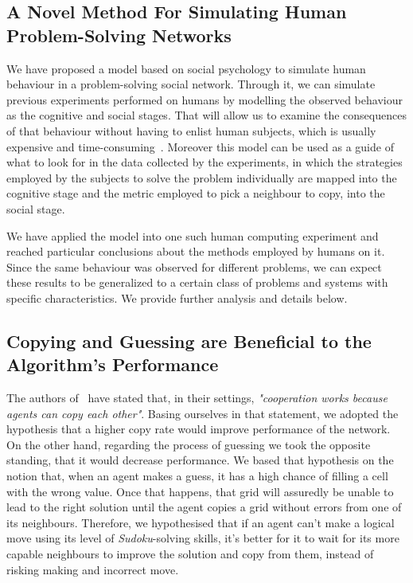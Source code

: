 \documentclass{article}
\begin{document}
\subsection{A Novel Method For Simulating Human Problem-Solving Networks}

We have proposed a model based on social psychology to simulate human behaviour in a problem-solving social network. Through it, we can simulate previous experiments performed on humans by modelling the observed behaviour as the cognitive and social stages. That will allow us to examine the consequences of that behaviour without having to enlist human subjects, which is usually expensive and time-consuming~\cite{?}. Moreover this model can be used as a guide of what to look for in the data collected by the experiments, in which the strategies employed by the subjects to solve the problem individually are mapped into the cognitive stage and the metric employed to pick a neighbour to copy, into the social stage.

We have applied the model into one such human computing experiment and reached particular conclusions about the methods employed by humans on it. Since the same behaviour was observed for different problems, we can expect these results to be generalized to a certain class of problems and systems with specific characteristics. We provide further analysis and details below.

\subsection{Copying and Guessing are Beneficial to the Algorithm's Performance}

The authors of~\cite{farenzena:collabem} have stated that, in their settings, {\em "cooperation works because agents can copy each other"}. Basing ourselves in that statement, we adopted the hypothesis that a higher copy rate would improve performance of the network. On the other hand, regarding the process of guessing we took the opposite standing, that it would decrease performance. We based that hypothesis on the notion that, when an agent makes a guess, it has a high chance of filling a cell with the wrong value. Once that happens, that grid will assuredly be unable to lead to the right solution until the agent copies a grid without errors from one of its neighbours. Therefore, we hypothesised that if an agent can't make a logical move using its level of \emph{Sudoku}-solving skills, it's better for it to wait for its more capable neighbours to improve the solution and copy from them, instead of risking making and incorrect move.
\end{document}
